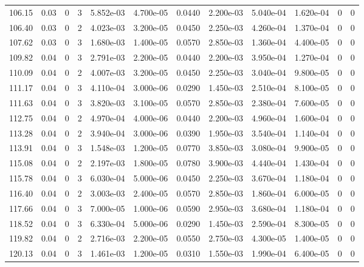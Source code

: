 \documentclass[preview]{standalone}
\begin{document}
{{{{{\begin{tabular}{L{1.2cm}C{1.2cm} C{0.3cm}C{0.5cm} C{1.4cm}C{1.4cm} C{1.4cm}C{1.4cm} C{1.6cm}C{1.6cm} C{1.6cm}C{1.6cm}}
  106.15  &  0.03  & 0     &  3 &  5.852e-03  & 4.700e-05  &  0.0440&   2.200e-03& 5.040e-04 & 1.620e-04   &  0 & 0  \\ 
  106.40  &  0.03  & 0     &  2 &  4.023e-03  & 3.200e-05  &  0.0450&   2.250e-03& 4.260e-04 & 1.370e-04   &  0 & 0  \\ 
  107.62  &  0.03  & 0     &  3 &  1.680e-03  & 1.400e-05  &  0.0570&   2.850e-03& 1.360e-04 & 4.400e-05   &  0 & 0  \\ 
  109.82  &  0.04  & 0     &  3 &  2.791e-03  & 2.200e-05  &  0.0440&   2.200e-03& 3.950e-04 & 1.270e-04   &  0 & 0  \\ 
  110.09  &  0.04  & 0     &  2 &  4.007e-03  & 3.200e-05  &  0.0450&   2.250e-03& 3.040e-04 & 9.800e-05   &  0 & 0  \\ 
  111.17  &  0.04  & 0     &  3 &  4.110e-04  & 3.000e-06  &  0.0290&   1.450e-03& 2.510e-04 & 8.100e-05   &  0 & 0  \\ 
  111.63  &  0.04  & 0     &  3 &  3.820e-03  & 3.100e-05  &  0.0570&   2.850e-03& 2.380e-04 & 7.600e-05   &  0 & 0  \\ 
  112.75  &  0.04  & 0     &  2 &  4.970e-04  & 4.000e-06  &  0.0440&   2.200e-03& 4.960e-04 & 1.600e-04   &  0 & 0  \\ 
  113.28  &  0.04  & 0     &  2 &  3.940e-04  & 3.000e-06  &  0.0390&   1.950e-03& 3.540e-04 & 1.140e-04   &  0 & 0  \\ 
  113.91  &  0.04  & 0     &  3 &  1.548e-03  & 1.200e-05  &  0.0770&   3.850e-03& 3.080e-04 & 9.900e-05   &  0 & 0  \\ 
  115.08  &  0.04  & 0     &  2 &  2.197e-03  & 1.800e-05  &  0.0780&   3.900e-03& 4.440e-04 & 1.430e-04   &  0 & 0  \\ 
  115.78  &  0.04  & 0     &  3 &  6.030e-04  & 5.000e-06  &  0.0450&   2.250e-03& 3.670e-04 & 1.180e-04   &  0 & 0  \\ 
  116.40  &  0.04  & 0     &  2 &  3.003e-03  & 2.400e-05  &  0.0570&   2.850e-03& 1.860e-04 & 6.000e-05   &  0 & 0  \\ 
  117.66  &  0.04  & 0     &  3 &  7.000e-05  & 1.000e-06  &  0.0590&   2.950e-03& 3.680e-04 & 1.180e-04   &  0 & 0  \\ 
  118.52  &  0.04  & 0     &  3 &  6.330e-04  & 5.000e-06  &  0.0290&   1.450e-03& 2.590e-04 & 8.300e-05   &  0 & 0  \\ 
  119.82  &  0.04  & 0     &  2 &  2.716e-03  & 2.200e-05  &  0.0550&   2.750e-03& 4.300e-05 & 1.400e-05   &  0 & 0  \\ 
  120.13  &  0.04  & 0     &  3 &  1.461e-03  & 1.200e-05  &  0.0310&   1.550e-03& 1.990e-04 & 6.400e-05   &  0 & 0  \\ 

\end{tabular}}}}}}
\end{document}
